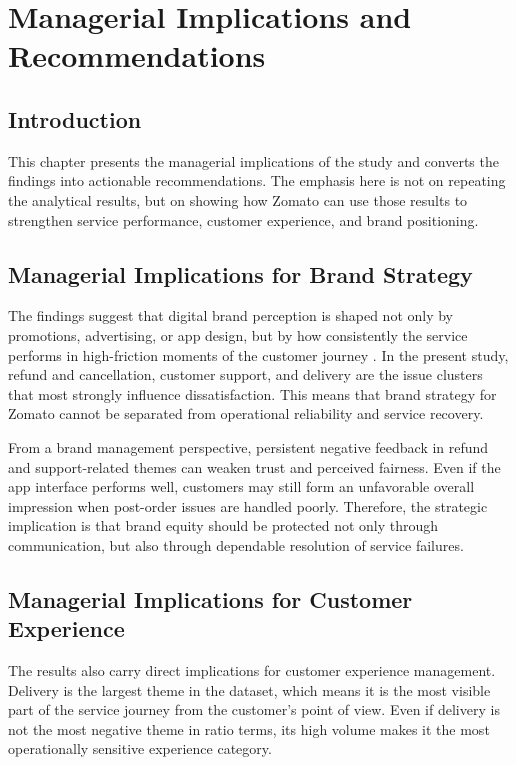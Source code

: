 \chapter{Managerial Implications and Recommendations}

\section{Introduction}

This chapter presents the managerial implications of the study and converts the findings into actionable recommendations. The emphasis here is not on repeating the analytical results, but on showing how Zomato can use those results to strengthen service performance, customer experience, and brand positioning.

\section{Managerial Implications for Brand Strategy}

The findings suggest that digital brand perception is shaped not only by promotions, advertising, or app design, but by how consistently the service performs in high-friction moments of the customer journey \cite{lemon2016,verhoef2010,keller2013}. In the present study, refund and cancellation, customer support, and delivery are the issue clusters that most strongly influence dissatisfaction. This means that brand strategy for Zomato cannot be separated from operational reliability and service recovery.

From a brand management perspective, persistent negative feedback in refund and support-related themes can weaken trust and perceived fairness. Even if the app interface performs well, customers may still form an unfavorable overall impression when post-order issues are handled poorly. Therefore, the strategic implication is that brand equity should be protected not only through communication, but also through dependable resolution of service failures.

\section{Managerial Implications for Customer Experience}

The results also carry direct implications for customer experience management. Delivery is the largest theme in the dataset, which means it is the most visible part of the service journey from the customer's point of view. Even if delivery is not the most negative theme in ratio terms, its high volume makes it the most operationally sensitive experience category.

